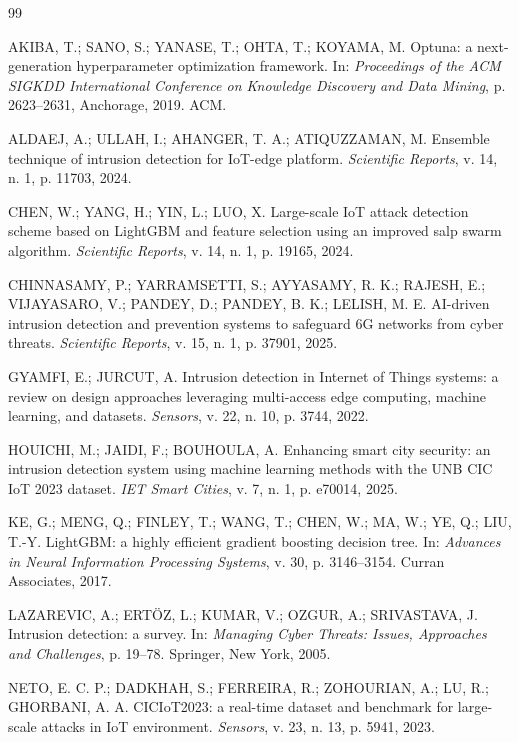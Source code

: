 \documentclass[12pt]{article}
\begin{document}
\begin{thebibliography}{99}

AKIBA, T.; SANO, S.; YANASE, T.; OHTA, T.; KOYAMA, M. {Optuna}: a
next-generation hyperparameter optimization framework. In:
\textit{Proceedings of the ACM SIGKDD International Conference on Knowledge
Discovery and Data Mining}, p. 2623--2631, Anchorage, 2019. ACM.

ALDAEJ, A.; ULLAH, I.; AHANGER, T. A.; ATIQUZZAMAN, M. Ensemble technique of
intrusion detection for {IoT}-edge platform. \textit{Scientific Reports},
v. 14, n. 1, p. 11703, 2024.

CHEN, W.; YANG, H.; YIN, L.; LUO, X. Large-scale {IoT} attack detection scheme
based on {LightGBM} and feature selection using an improved salp swarm
algorithm. \textit{Scientific Reports}, v. 14, n. 1, p. 19165, 2024.

CHINNASAMY, P.; YARRAMSETTI, S.; AYYASAMY, R. K.; RAJESH, E.; VIJAYASARO, V.;
PANDEY, D.; PANDEY, B. K.; LELISH, M. E. {AI}-driven intrusion detection and
prevention systems to safeguard {6G} networks from cyber threats.
\textit{Scientific Reports}, v. 15, n. 1, p. 37901, 2025.

GYAMFI, E.; JURCUT, A. Intrusion detection in {Internet} of {Things} systems: a
review on design approaches leveraging multi-access edge computing, machine
learning, and datasets. \textit{Sensors}, v. 22, n. 10, p. 3744, 2022.

HOUICHI, M.; JAIDI, F.; BOUHOULA, A. Enhancing smart city security: an intrusion
detection system using machine learning methods with the {UNB CIC IoT 2023}
dataset. \textit{IET Smart Cities}, v. 7, n. 1, p. e70014, 2025.

KE, G.; MENG, Q.; FINLEY, T.; WANG, T.; CHEN, W.; MA, W.; YE, Q.; LIU, T.-Y.
{LightGBM}: a highly efficient gradient boosting decision tree. In:
\textit{Advances in Neural Information Processing Systems}, v. 30,
p. 3146--3154. Curran Associates, 2017.

LAZAREVIC, A.; ERT{\"O}Z, L.; KUMAR, V.; OZGUR, A.; SRIVASTAVA, J. Intrusion
detection: a survey. In: \textit{Managing Cyber Threats: Issues, Approaches
and Challenges}, p. 19--78. Springer, New York, 2005.

NETO, E. C. P.; DADKHAH, S.; FERREIRA, R.; ZOHOURIAN, A.; LU, R.;
GHORBANI, A. A. {CICIoT2023}: a real-time dataset and benchmark for large-scale
attacks in {IoT} environment. \textit{Sensors}, v. 23, n. 13, p. 5941, 2023.


\end{thebibliography}
\end{document}
